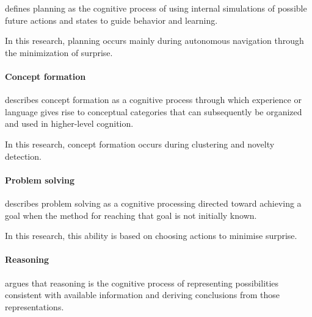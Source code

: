 \documentclass[a4paper]{article}
\begin{document}
               \cite{mattar-2026-planning-in-the-brain-its-not-what-you-think-it-is} defines planning as the cognitive process of using internal simulations of possible future actions and states to guide behavior and learning.

               In this research, planning occurs mainly during autonomous navigation through the minimization of surprise.
            \paragraph{Concept formation}
               \cite{sloutsky-2019-categories-concepts-and-conceptual-development}
               describes concept formation as a cognitive process through which experience or language gives rise to conceptual categories that can subsequently be organized and used in higher-level cognition.

               In this research, concept formation occurs during clustering and novelty detection.
            \paragraph{Problem solving}

               \cite{mayer-2013-problem-solving} describes problem solving as a cognitive processing directed toward achieving a goal when the method for reaching that goal is not initially known.

               In this research, this ability is based on choosing actions to minimise surprise.

            \paragraph{Reasoning}

               \cite{johnson-laird-2010-mental-models-and-human-reasoning} argues that reasoning is the cognitive process of representing possibilities consistent with available information and deriving conclusions from those representations.
\end{document}

